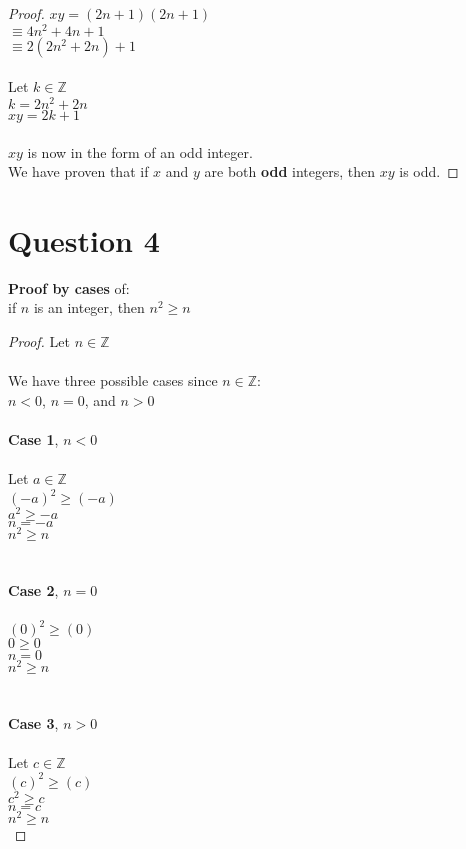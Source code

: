 \documentclass{article}
\begin{document}
\begin{proof}
    $xy = (2n + 1)(2n + 1)$ \\ 
    $\equiv 4n^2 + 4n + 1$ \\
    $\equiv 2(2n^2 + 2n) + 1$\\ \\
    Let $k \in \mathbb{Z}$ \\
    $k = 2n^2 + 2n$ \\
    $xy = 2k + 1$ \\ \\
    $xy$ is now in the form of an odd integer. \\
    We have proven that if $x$ and $y$ are both \textbf{odd} integers, then $xy$ is odd.  \end{proof}
    
    \newpage
    \section*{Question 4}
    \textbf{Proof by cases} of: \\
    \indent if $n$ is an integer, then $n^2 \geq n$ 
    \begin{proof} Let $n \in \mathbb{Z}$ \\ \\
    We have three possible cases since $n \in \mathbb{Z}$: \\
    \indent $n < 0$, $n = 0$, and $n > 0$ \\ \\
    \textbf{Case 1}, $n < 0$ \\ \\
    \indent Let $a \in \mathbb{Z}$ \\
    \indent $(-a)^2 \geq (-a)$ \\
    \indent $a^2 \geq -a$ \\ 
    \indent $n = -a$ \\
    \indent $n^2 \geq n$ \\ \\ \\
    \textbf{Case 2}, $n = 0$ \\ \\
    \indent $(0)^2 \geq (0)$ \\
    \indent $0 \geq 0$ \\ 
    \indent $n = 0$ \\
    \indent $n^2 \geq n$ \\ \\ \\
    \textbf{Case 3}, $n > 0$ \\ \\
    \indent Let $c \in \mathbb{Z}$ \\
    \indent $(c)^2 \geq (c)$ \\
    \indent $c^2 \geq c$ \\ 
    \indent $n = c$ \\
    \indent $n^2 \geq n$  \\ \end{proof}
    
\end{document}
